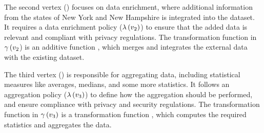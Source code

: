The second vertex () focuses on data enrichment, where additional information from the states of New York and New Hampshire is integrated into the dataset.
It requires a data enrichment policy ($\lambda\,(v_2)$) to ensure that the added data is relevant and compliant with privacy regulations.
The transformation function  in $\gamma\,(v_2$) is an additive function , which merges and integrates the external data with the existing dataset.

  The third vertex () is responsible for aggregating data, including statistical measures like averages, medians, and some more statistics.
  It follows an aggregation policy ($\lambda\,(v_3)$) to define how the aggregation should be performed, and ensure compliance with privacy and security regulations.
  The transformation function  in $\gamma\,(v_3)$ is a transformation function , which computes the required statistics and aggregates the data.

